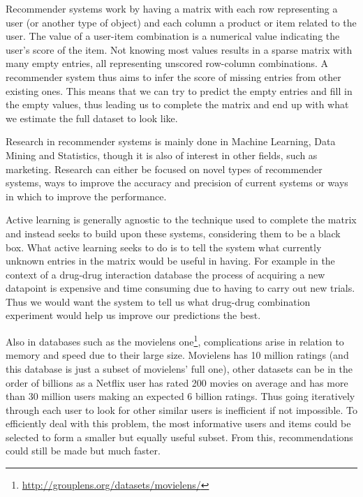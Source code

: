 Recommender systems work by having a matrix with each row representing a user (or another type of object) and each column a product or item related to the user. The value of a user-item combination is a numerical value indicating the user's score of the item. Not knowing most values results in a sparse matrix with many empty entries, all representing unscored row-column combinations. A recommender system thus aims to infer the score of missing entries from other existing ones. This means that we can try to predict the empty entries and fill in the empty values, thus leading us to complete the matrix and end up with what we estimate the full dataset to look like.

Research in recommender systems is mainly done in Machine Learning, Data Mining and Statistics, though it is also of interest in other fields, such as marketing. Research can either be focused on novel types of recommender systems, ways to improve the accuracy and precision of current systems or ways in which to improve the performance. 

Active learning is generally agnostic to the technique used to complete the matrix and instead seeks to build upon these systems, considering them to be a black box. What active learning seeks to do is to tell the system what currently unknown entries in the matrix would be useful in having. For example in the context of a drug-drug interaction database the process of acquiring a new datapoint is expensive and time consuming due to having to carry out new trials. Thus we would want the system to tell us what drug-drug combination experiment would help us improve our predictions the best. 

Also in databases such as the movielens one\footnote{\url{http://grouplens.org/datasets/movielens/}}, complications arise in relation to memory and speed due to their large size. Movielens has 10 million ratings (and this database is just a subset of movielens' full one), other datasets can be in the order of billions as a Netflix user has rated 200 movies on average and has more than 30 million users making an expected 6 billion ratings. Thus going iteratively through each user to look for other similar users is inefficient if not impossible. To efficiently deal with this problem, the most informative users and items could be selected to form a smaller but equally useful subset. From this, recommendations could still be made but much faster. 
